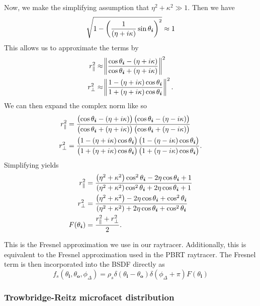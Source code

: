\documentclass[12pt]{article}
\begin{document}
Now, we make the simplifying assumption that \(\eta^2 + \kappa^2 \gg 1\). Then we have
\[\sqrt{1 - \del{\frac{1}{\del{\eta + i\kappa}}\sin \theta_{\bm i}}^2} \approx 1\]
This allows us to approximate the terms by
\begin{align*}
  r_{\parallel}^2 &\approx \norm{\frac{\cos \theta_{\bm i} - \del{\eta + i\kappa}}{\cos \theta_{\bm i} + \del{\eta + i\kappa}}}^2\\
  r_{\perp}^2 &\approx \norm{\frac{1 - \del{\eta + i\kappa}\cos \theta_{\bm i}}{1 + \del{\eta + i\kappa} \cos \theta_{\bm i}}}^2.
\end{align*}
We can then expand the complex norm like so
\begin{align*}
  r_{\parallel}^2 &= \frac{\del{\cos \theta_{\bm i} - \del{\eta + i\kappa}}\del{\cos \theta_{\bm i} - \del{\eta - i\kappa}}}{\del{\cos \theta_{\bm i} + \del{\eta + i\kappa}}\del{\cos \theta_{\bm i} + \del{\eta - i\kappa}}}\\
  r_{\perp}^2 &= \frac{\del{1 - \del{\eta + i\kappa}\cos \theta_{\bm i}}\del{1 - \del{\eta - i\kappa}\cos \theta_{\bm i}}}{\del{1 + \del{\eta + i\kappa} \cos \theta_{\bm i}}\del{1 + \del{\eta - i\kappa} \cos \theta_{\bm i}}}.
\end{align*}
Simplifying yields
\begin{align*}
  r_{\parallel}^2 &= \frac{\del{\eta^2 + \kappa^2}\cos^2 \theta_{\bm i} - 2\eta \cos \theta_{\bm i} + 1}{\del{\eta^2 + \kappa^2}\cos^2 \theta_{\bm i} + 2\eta \cos \theta_{\bm i} + 1}\\
  r_{\perp}^2 &= \frac{\del{\eta^2 + \kappa^2} - 2\eta \cos \theta_{\bm i} + \cos^2 \theta_{\bm i}}{\del{\eta^2 + \kappa^2} + 2\eta \cos \theta_{\bm i} + \cos^2 \theta_{\bm i}}\\
  F(\theta_{\bm i}) &= \frac{r_{\parallel}^2 + r_{\perp}^2}{2}.
\end{align*}

This is the Fresnel approximation we use in our raytracer.
Additionally, this is equivalent to the Fresnel approximation used in the PBRT raytracer.
The Fresnel term is then incorporated into the BSDF directly as
\[f_s(\theta_{\bm i}, \theta_{\bm o}, \phi_\Delta) = \rho_s \delta(\theta_{\bm i} - \theta_{\bm o})\delta(\phi_\Delta + \pi)F(\theta_{\bm i})\]

\subsubsection{Trowbridge-Reitz microfacet distribution}
\end{document}
